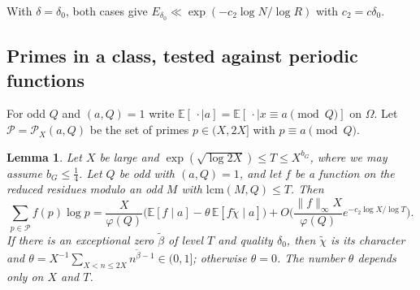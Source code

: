 \documentclass[11pt]{amsart}
\newtheorem{lemma}{Lemma}[section]
\theoremstyle{remark}
\newcommand{\E}{\mathbb{E}}
\begin{document}
With $\delta=\delta_0$, both cases give $E_{\delta_0}\ll\exp(-c_2\log N/\log R)$ with $c_2=c\delta_0$.

\subsection{Primes in a class, tested against periodic functions}

For odd $Q$ and $(a,Q)=1$ write $\E[\,\cdot\mid a]=\E[\,\cdot\mid x\equiv a\pmod Q]$ on $\Omega$. Let $\mathcal P=\mathcal P_X(a,Q)$ be the set of primes $p\in(X,2X]$ with $p\equiv a\pmod Q$.

\begin{lemma}\label{lem:Ga}
Let $X$ be large and $\exp(\sqrt{\log 2X})\le T\le X^{b_G}$, where we may assume $b_G\le\frac14$. Let $Q$ be odd with $(a,Q)=1$, and let $f$ be a function on the reduced residues modulo an odd $M$ with $\mathrm{lcm}(M,Q)\le T$. Then
\[
\sum_{p\in\mathcal P}f(p)\log p=\frac X{\varphi(Q)}\Big(\E[f\mid a]-\theta\,\E[f\tilde\chi\mid a]\Big)+O\Big(\frac{\|f\|_\infty X}{\varphi(Q)}e^{-c_2\log X/\log T}\Big).
\]
If there is an exceptional zero $\tilde\beta$ of level $T$ and quality $\delta_0$, then $\tilde\chi$ is its character and $\theta=X^{-1}\sum_{X<n\le2X}n^{\tilde\beta-1}\in(0,1]$; otherwise $\theta=0$. The number $\theta$ depends only on $X$ and $T$.
\end{lemma}
\end{document}
